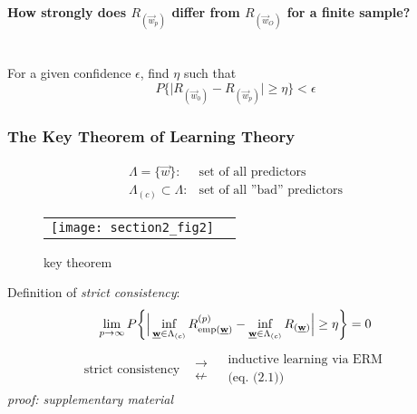\paragraph{How strongly does $R_{(\vec{w}_p)}$ differ from $R_{(\vec{w}_O)}$ for a finite sample?} \mbox{}
\\
For a given confidence $\epsilon$, find $\eta$ such that
\begin{equation}
	P \Big\{ \big| R_{(\vec{w}_0)} - R_{(\vec{w}_p)} \big| \geq \eta \Big\}
		< \epsilon
\end{equation}


\subsubsection{The Key Theorem of Learning Theory}
\[ \begin{array}{ll}
	\Lambda = \{ \vec{w} \}: & \text{set of all predictors} \\
	\Lambda_{(c)} \subset \Lambda: & \text{set of all ''bad'' predictors}
\end{array} \]
\begin{figure}[h]
  \centering
  \begin{tabular}[h]{c c}
	\texttt{[image: section2\_fig2]}  
& \raisebox{15mm}{$\times\times\times: \Lambda_{(c)} = \big\{ \vec{w}: R_{(\vec{w})} \geq c \big\}$} 
  \end{tabular}
  \caption{key theorem}
\end{figure}




Definition of \emph{strict consistency}:
\begin{equation}
	\lim_{p \rightarrow \infty} P \bigg\{ \Big| 
		\inf_{\underline{\mathbf{w}} \in \Lambda_{(c)}} R_{\operatorname{emp} (\underline{\mathbf{w}})}^{(p)}
		- \inf_{\underline{\mathbf{w}} \in \Lambda_{(c)}} R_{(\underline{\mathbf{w}})}
		\Big| \geq \eta \bigg\} = 0
\end{equation}
\[ \begin{array}{lcl}
	\text{strict consistency}
	& \substack{ \rightarrow \\ \nleftarrow}
	& \substack{ \text{inductive learning via ERM} \\
			\text{(eq. (2.1))} }
\end{array} \]
{\it proof: supplementary material}


